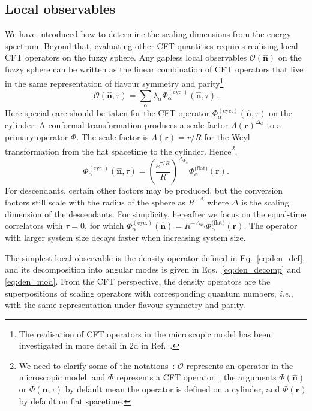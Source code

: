 \documentclass{timesjhep}
\begin{document}
\subsection{Local observables}
\label{sec:construct_obs}

We have introduced how to determine the scaling dimensions from the energy spectrum. Beyond that, evaluating other CFT quantities requires realising local CFT operators on the fuzzy sphere. Any gapless local observables $\mathcal{O}(\hat{\mathbf{n}})$ on the fuzzy sphere can be written as the linear combination of CFT operators that live in the same representation of flavour symmetry and parity\footnote{The realisation of CFT operators in the microscopic model has been investigated in more detail in 2d in Ref.~\cite{Zou2019Operator2d}.}~\cite{Hu2023Mar}
\begin{equation}
    \mathcal{O}(\hat{\mathbf{n}},\tau)=\sum_\alpha \lambda_\alpha\Phi^{(\textrm{cyc.})}_\alpha(\hat{\mathbf{n}},\tau).
\end{equation}
Here special care should be taken for the CFT operator $\Phi^{(\textrm{cyc.})}_\alpha(\hat{\mathbf{n}},\tau)$ on the cylinder. A conformal transformation produces a scale factor $\Lambda(\mathbf{r})^{\Delta_\Phi}$ to a primary operator $\Phi$. The scale factor is $\Lambda(\mathbf{r})=r/R$ for the Weyl transformation from the flat spacetime to the cylinder. Hence\footnote{We need to clarify some of the notations~: $\mathcal{O}$ represents an operator in the microscopic model, and $\Phi$ represents a CFT operator~; the arguments $\Phi(\hat{\mathbf{n}})$ or $\Phi(\hat{\mathbf{n}},\tau)$ by default mean the operator is defined on a cylinder, and $\Phi(\mathbf{r})$ by default on flat spacetime.},
\begin{equation}
    \Phi^{(\textrm{cyc.})}_\alpha(\hat{\mathbf{n}},\tau)=\left(\frac{e^{\tau/R}}{R}\right)^{\Delta_{\Phi_\alpha}}\Phi_\alpha^{\textrm{(flat)}}(\mathbf{r}).
\end{equation}
For descendants, certain other factors may be produced, but the conversion factors still scale with the radius of the sphere as $R^{-\Delta}$ where $\Delta$ is the scaling dimension of the descendants. For simplicity, hereafter we focus on the equal-time correlators with $\tau=0$, for which $\Phi^{(\textrm{cyc.})}_\alpha(\hat{\mathbf{n}})=R^{-\Delta_{\Phi_\alpha}}\Phi_\alpha^{\textrm{(flat)}}(\mathbf{r})$. The operator with larger system size decays faster when increasing system size.

The simplest local observable is the density operator defined in Eq.~\eqref{eq:den_def}, and its decomposition into angular modes is given in Eqs.~\eqref{eq:den_decomp} and \eqref{eq:den_mod}. From the CFT perspective, the density operators are the superpositions of scaling operators with corresponding quantum numbers, \textit{i.e.}, with the same representation under flavour symmetry and parity.
\end{document}
